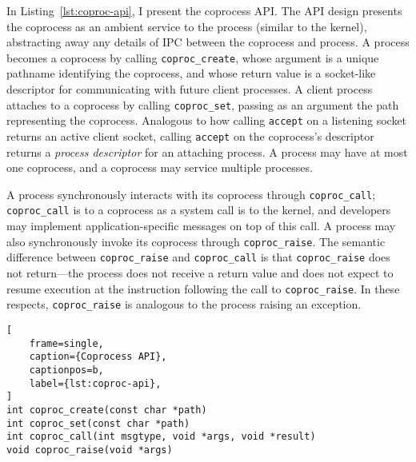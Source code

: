 %
In Listing~\ref{lst:coproc-api}, I present the coprocess API\@.
%
The API design presents the coprocess as an ambient service to the process
(similar to the kernel), abstracting away any details of IPC between the
coprocess and process.
%
A process becomes a coprocess by calling \texttt{coproc\_create}, whose
argument is a unique pathname identifying the coprocess, and whose return value
is a socket-like descriptor for communicating with future client processes.
%
A client process attaches to a coprocess by calling \texttt{coproc\_set}, passing as an
argument the path representing the coprocess.
%
Analogous to how calling \texttt{accept} on a listening socket returns an
active client socket, calling \texttt{accept} on the coprocess's descriptor
returns a \emph{process descriptor} for an attaching process.
%
A process may have at most one coprocess, and a coprocess may service multiple
processes.
%


A process synchronously interacts with its coprocess through
\texttt{coproc\_call}; \texttt{coproc\_call} is to a coprocess as a system call
is to the kernel, and developers may implement application-specific messages
on top of this call.
%
A process may also synchronously invoke its coprocess through
\texttt{coproc\_raise}.
%
The semantic difference between \texttt{coproc\_raise} and
\texttt{coproc\_call} is that \texttt{coproc\_raise} does not return---the
process does not receive a return value and does not expect to resume
execution at the instruction following the call to \texttt{coproc\_raise}.
%
In these respects, \texttt{coproc\_raise} is analogous to the process raising
an exception.

\begin{lstlisting}[
    frame=single, 
    caption={Coprocess API},
    captionpos=b,
    label={lst:coproc-api},
]
int coproc_create(const char *path)
int coproc_set(const char *path)
int coproc_call(int msgtype, void *args, void *result)
void coproc_raise(void *args)
\end{lstlisting}


%


